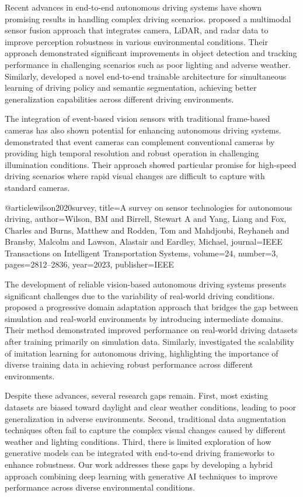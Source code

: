 \documentclass[pdflatex,sn-mathphys-num]{sn-jnl}%
\theoremstyle{thmstyleone}%
\theoremstyle{thmstyletwo}%
\theoremstyle{thmstylethree}%
\begin{document}
Recent advances in end-to-end autonomous driving systems have shown promising results in handling complex driving scenarios. \citet{xiao2020multimodal} proposed a multimodal sensor fusion approach that integrates camera, LiDAR, and radar data to improve perception robustness in various environmental conditions. Their approach demonstrated significant improvements in object detection and tracking performance in challenging scenarios such as poor lighting and adverse weather. Similarly, \citet{chowdhuri2019multinet} developed a novel end-to-end trainable architecture for simultaneous learning of driving policy and semantic segmentation, achieving better generalization capabilities across different driving environments.

The integration of event-based vision sensors with traditional frame-based cameras has also shown potential for enhancing autonomous driving systems. \citet{maqueda2018event} demonstrated that event cameras can complement conventional cameras by providing high temporal resolution and robust operation in challenging illumination conditions. Their approach showed particular promise for high-speed driving scenarios where rapid visual changes are difficult to capture with standard cameras.

@article{wilson2020survey,
  title={A survey on sensor technologies for autonomous driving},
  author={Wilson, BM and Birrell, Stewart A and Yang, Liang and Fox, Charles and Burns, Matthew and Rodden, Tom and Mahdjoubi, Reyhaneh and Bransby, Malcolm and Lawson, Alastair and Eardley, Michael},
  journal={IEEE Transactions on Intelligent Transportation Systems},
  volume={24},
  number={3},
  pages={2812--2836},
  year={2023},
  publisher={IEEE}
}

The development of reliable vision-based autonomous driving systems presents significant challenges due to the variability of real-world driving conditions. \citet{chen2020progressive} proposed a progressive domain adaptation approach that bridges the gap between simulation and real-world environments by introducing intermediate domains. Their method demonstrated improved performance on real-world driving datasets after training primarily on simulation data. Similarly, \citet{sun2020scalability} investigated the scalability of imitation learning for autonomous driving, highlighting the importance of diverse training data in achieving robust performance across different environments. 

Despite these advances, several research gaps remain. First, most existing datasets are biased toward daylight and clear weather conditions, leading to poor generalization in adverse environments. Second, traditional data augmentation techniques often fail to capture the complex visual changes caused by different weather and lighting conditions. Third, there is limited exploration of how generative models can be integrated with end-to-end driving frameworks to enhance robustness. Our work addresses these gaps by developing a hybrid approach combining deep learning with generative AI techniques to improve performance across diverse environmental conditions.
\end{document}

